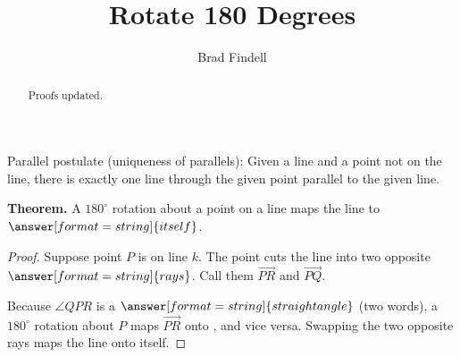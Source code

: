 \documentclass[nooutcomes]{ximera}
\title{Rotate 180 Degrees}
\author{Brad Findell}
\begin{document}
\begin{abstract}
Proofs updated. 
\end{abstract}
\maketitle


\begin{axiom}
Parallel postulate (uniqueness of parallels):  Given a line and a point not on the line, there is exactly one line through the given point parallel to the given line.  
\end{axiom}

\begin{problem}

\textbf{Theorem.} A $180^\circ$ rotation about a point on a line maps the line to 
$\answer[format=string]{itself}$. 

\begin{proof}
Suppose point $P$ is on line $k$.  The point cuts the line into two opposite $\answer[format=string]{rays}$.  Call them $\overrightarrow{PR}$ and $\overrightarrow{PQ}$.  
\begin{image}
\end{image}

Because $\angle QPR$ is a $\answer[format=string]{straight angle}$ (two words), a $180^\circ$ rotation about $P$ maps $\overrightarrow{PR}$ onto , and vice versa.  Swapping the two opposite rays maps the line onto itself.  
\end{proof}
\end{problem}
\end{document}
